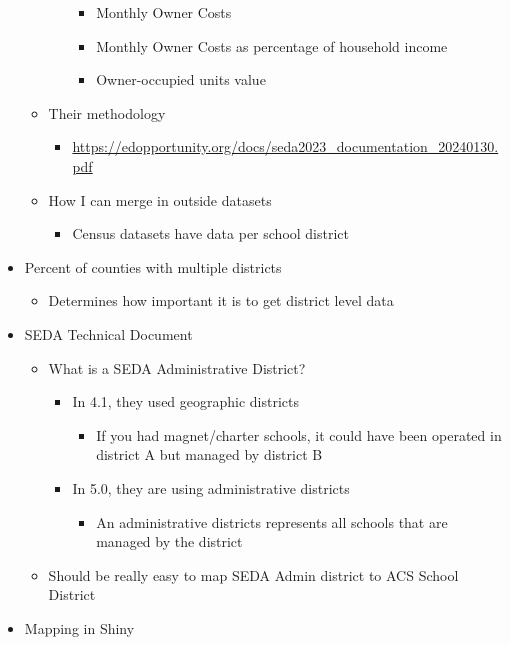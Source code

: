 \documentclass[
  letterpaper,
  DIV=11,
  numbers=noendperiod]{scrartcl}
\providecommand{\tightlist}{%
  \setlength{\itemsep}{0pt}\setlength{\parskip}{0pt}}\usepackage{longtable,booktabs,array}
\begin{document}
\begin{itemize}
\begin{itemize}
\begin{itemize}
      \begin{itemize}
      \item
        Monthly Owner Costs
      \item
        Monthly Owner Costs as percentage of household income
      \item
        Owner-occupied units value
      \end{itemize}
    \end{itemize}
  \item
    Their methodology

    \begin{itemize}
    \tightlist
    \item
      \url{https://edopportunity.org/docs/seda2023_documentation_20240130.pdf}
    \end{itemize}
  \item
    How I can merge in outside datasets

    \begin{itemize}
    \tightlist
    \item
      Census datasets have data per school district
    \end{itemize}
  \end{itemize}
\item
  Percent of counties with multiple districts

  \begin{itemize}
  \tightlist
  \item
    Determines how important it is to get district level data
  \end{itemize}
\item
  SEDA Technical Document

  \begin{itemize}
  \item
    What is a SEDA Administrative District?

    \begin{itemize}
    \item
      In 4.1, they used geographic districts

      \begin{itemize}
      \tightlist
      \item
        If you had magnet/charter schools, it could have been operated
        in district A but managed by district B
      \end{itemize}
    \item
      In 5.0, they are using administrative districts

      \begin{itemize}
      \tightlist
      \item
        An administrative districts represents all schools that are
        managed by the district
      \end{itemize}
    \end{itemize}
  \item
    Should be really easy to map SEDA Admin district to ACS School
    District
  \end{itemize}
\item
  Mapping in Shiny


\end{itemize}
\end{document}
